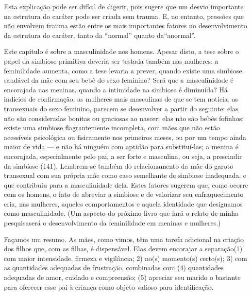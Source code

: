 Esta explicação pode ser difícil de digerir, pois sugere que um
desvio importante na estrutura do caráter pode ser criada sem trauma.
E, no entanto, pressões\idxtransepres{} que não envolvem trauma estão entre os mais
importantes fatores no desenvolvimento da estrutura do caráter, tanto
da ``normal'' quanto da\idxtransepres[|)]
``anormal''.

Este capítulo é sobre a masculinidade nos homens. Apesar disto, a
tese sobre o papel da simbiose primitiva deveria ser testada também
nas mulheres: a feminilidade aumenta, como a tese levaria a prever,
quando existe uma simbiose saudável da mãe com seu bebê do sexo
feminino? Será que a masculinidade é encorajada nas meninas, quando a
intimidade na simbiose é diminuída? Há indícios de confirmação: as
mulheres mais masculinas de que se tem notícia, as transexuais do sexo\idxtransetran{}
feminino,\idxmascumul{} parecem se desenvolver a partir do seguinte: elas não são
consideradas bonitas ou graciosas ao nascer; elas não são bebês
fofinhos; existe uma simbiose flagrantemente incompleta, com mães que
não estão acessíveis psicológica ou fisicamente nos primeiros meses,
ou por um tempo ainda maior de vida --- e não há ninguém com aptidão
para substituí-las; a menina é encorajada, especialmente pelo pai, a
ser forte e masculina, ou seja, a prescindir da simbiose (141).
Lembrem-se também do relacionamento da mãe do garoto transexual com
sua própria mãe como caso semelhante de simbiose inadequada, e que
contribuiu para a masculinidade dela. Estes fatores sugerem que, como
ocorre com os homens, o fato de abreviar a simbiose e de valorizar seu
enfraquecimento cria, nas mulheres, aqueles comportamentos e aquela
identidade que designamos como masculinidade. (Um aspecto do próximo
livro que fará o relato de minha pesquisa\idxmaestran[|)] será o desenvolvimento da
feminilidade em meninas e mulheres.)\idxtransesimb[|)]

Façamos um resumo. As mães, como vimos, têm uma tarefa adicional na
criação dos filhos que, com as filhas, é dispensável. Elas devem
encorajar a\idxpervproce{} separação\idxmaesproc[|(] (1) com maior intensidade, firmeza e vigilância;
2) no(s) momento(s) certo(s); 3) com as quantidades adequadas de
frustração, combinadas com (4) quantidades adequadas de amor, cuidado e
compreensão; (5) apreciar seu marido o bastante para oferecer esse pai
à criança como objeto valioso para identificação.

